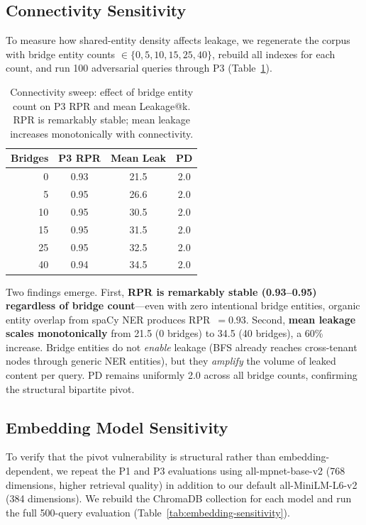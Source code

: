 \documentclass[letterpaper,twocolumn,10pt]{article}
\begin{document}
\subsection{Connectivity Sensitivity}
\label{sec:connectivity}

To measure how shared-entity density affects leakage, we regenerate
the corpus with bridge entity counts $\in \{0, 5, 10, 15, 25, 40\}$,
rebuild all indexes for each count, and run 100 adversarial queries
through P3 (Table~\ref{tab:connectivity}).

\begin{table}[t]
\centering
\caption{Connectivity sweep: effect of bridge entity count on P3
  RPR and mean Leakage@k. RPR is remarkably stable; mean leakage
  increases monotonically with connectivity.}
\label{tab:connectivity}
\small
\begin{tabular}{r|ccc}
\toprule
\textbf{Bridges} & \textbf{P3 RPR} & \textbf{Mean Leak} &
  \textbf{PD} \\
\midrule
  0  & 0.93 & 21.5 & 2.0 \\
  5  & 0.95 & 26.6 & 2.0 \\
  10 & 0.95 & 30.5 & 2.0 \\
  15 & 0.95 & 31.5 & 2.0 \\
  25 & 0.95 & 32.5 & 2.0 \\
  40 & 0.94 & 34.5 & 2.0 \\
\bottomrule
\end{tabular}
\end{table}

Two findings emerge. First, \textbf{RPR is remarkably stable
(0.93--0.95) regardless of bridge count}---even with zero intentional
bridge entities, organic entity overlap from spaCy NER produces
RPR~$= 0.93$. Second, \textbf{mean leakage scales monotonically}
from 21.5 (0 bridges) to 34.5 (40 bridges), a 60\% increase. Bridge
entities do not \emph{enable} leakage (BFS already reaches
cross-tenant nodes through generic NER entities), but they
\emph{amplify} the volume of leaked content per query. PD remains
uniformly 2.0 across all bridge counts, confirming the structural
bipartite pivot.

\subsection{Embedding Model Sensitivity}
\label{sec:embedding}

To verify that the pivot vulnerability is structural rather than
embedding-dependent, we repeat the P1 and P3 evaluations using
all-mpnet-base-v2 (768 dimensions, higher retrieval quality) in
addition to our default all-MiniLM-L6-v2 (384 dimensions). We rebuild
the ChromaDB collection for each model and run the full 500-query
evaluation (Table~\ref{tab:embedding-sensitivity}).
\end{document}
